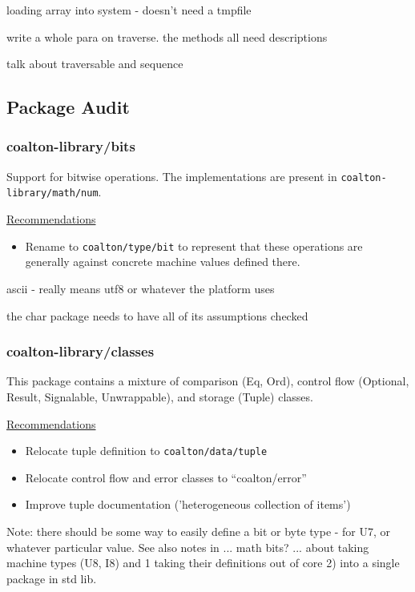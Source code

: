 \documentclass[12pt]{article}
\newcommand{\code}{\texttt}
\begin{document}
loading array into system - doesn't need a tmpfile

write a whole para on traverse. the methods all need descriptions

talk about traversable and sequence

\subsection{Package Audit}

\subsubsection{coalton-library/bits}

Support for bitwise operations. The implementations are present in \code{coalton-library/math/num}.

\medskip
\underline{Recommendations}

\begin{itemize}
\item Rename to \code{coalton/type/bit} to represent that these operations are generally against concrete machine values defined there.
\end{itemize}


ascii - really means utf8 or whatever the platform uses

the char package needs to have all of its assumptions checked

\subsubsection{coalton-library/classes}

This package contains a mixture of comparison (Eq, Ord), control flow
(Optional, Result, Signalable, Unwrappable), and storage (Tuple)
classes.

\medskip
\underline{Recommendations}

\begin{itemize}
\item Relocate tuple definition to \code{coalton/data/tuple}
\item Relocate control flow and error classes to ``coalton/error''
\item Improve tuple documentation ('heterogeneous collection of items')
\end{itemize}

Note: there should be some way to easily define a bit or byte type -
for U7, or whatever particular value. See also notes in ... math bits?
... about taking machine types (U8, I8) and 1 taking their definitions
out of core 2) into a single package in std lib.
\end{document}
